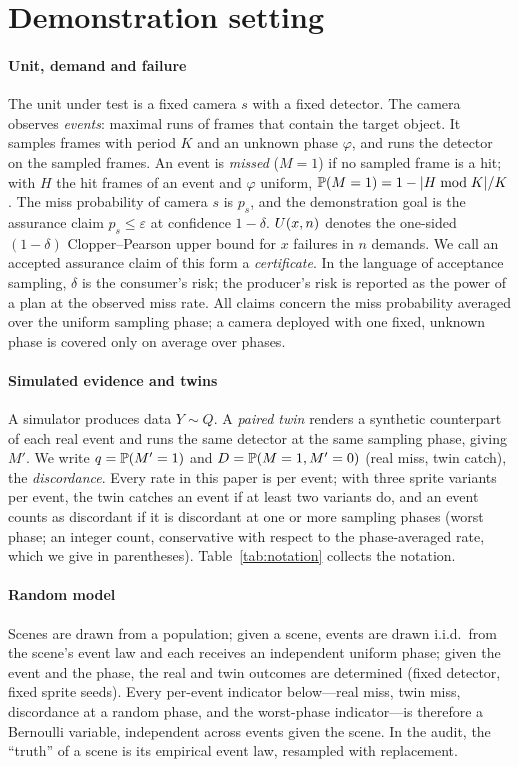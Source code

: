 \section{Demonstration setting}\label{sec:demo}

\paragraph{Unit, demand and failure} The unit under test is a fixed camera $s$ with a fixed detector. The camera observes
\emph{events}: maximal runs of frames that contain the target object. It samples frames with period $K$ and an unknown
phase $\varphi$, and runs the detector on the sampled frames. An event is \emph{missed} ($M=1$) if no sampled frame is a
hit; with $H$ the hit frames of an event and $\varphi$ uniform, $\mathbb{P}(M=1)=1-|H\bmod K|/K$. The miss probability of camera
$s$ is $p_s$, and the demonstration goal is the assurance claim $p_s\le\varepsilon$ at confidence $1-\delta$.
$U(x,n)$ denotes the one-sided $(1-\delta)$ Clopper--Pearson upper bound for $x$ failures in $n$ demands. We call an accepted assurance claim of this form a \emph{certificate}. In the language of acceptance sampling,
$\delta$ is the consumer's risk; the producer's risk is reported as the power of a plan at the observed miss rate.
All claims concern the miss probability averaged over the uniform sampling phase; a camera deployed with one fixed,
unknown phase is covered only on average over phases.

\paragraph{Simulated evidence and twins} A simulator produces data $Y\sim Q$. A \emph{paired twin} renders a synthetic
counterpart of each real event and runs the same detector at the same sampling phase, giving $M'$. We write
$q=\mathbb{P}(M'=1)$ and $D=\mathbb{P}(M=1,M'=0)$ (real miss, twin catch), the \emph{discordance}. Every rate in this paper is per
event; with three sprite variants per event, the twin catches an event if at least two variants do, and an event counts
as discordant if it is discordant at one or more sampling phases (worst phase; an integer count, conservative with
respect to the phase-averaged rate, which we give in parentheses). Table~\ref{tab:notation} collects the notation.

\paragraph{Random model} Scenes are drawn from a population; given a scene, events are drawn i.i.d.\ from the scene's
event law and each receives an independent uniform phase; given the event and the phase, the real and twin outcomes are
determined (fixed detector, fixed sprite seeds). Every per-event indicator below---real miss, twin miss, discordance at a
random phase, and the worst-phase indicator---is therefore a Bernoulli variable, independent across events given the
scene. In the audit, the ``truth'' of a scene is its empirical event law, resampled with replacement.

